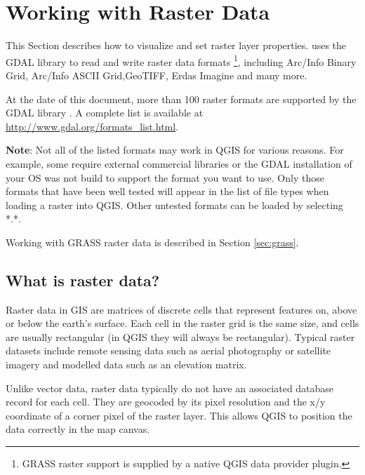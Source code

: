 
\chapter{Working with Raster Data}\label{label_raster}


This Section describes how to visualize and set raster layer properties.
\qg uses the GDAL library to read and write raster data formats
\footnote{GRASS raster support is supplied by a native QGIS data provider 
plugin.}, including Arc/Info Binary Grid, 
Arc/Info ASCII Grid,GeoTIFF,
Erdas Imagine and many more. 

At the date of this document, more than 100 raster formats are supported 
by the GDAL library \cite{GDALweb}. A complete list is available at 
\url{http://www.gdal.org/formats_list.html}.

\textbf{Note}: Not all of the listed formats may work in QGIS for various 
reasons. For example, some require external commercial libraries or 
the GDAL installation of your OS was not build to support the format you want
to use. Only those formats that have been well tested will appear in the list
of file types when loading a raster into QGIS. Other untested formats can 
be loaded by selecting *.*.

Working with GRASS raster data is described in Section \ref{sec:grass}.

\section{What is raster data?}\label{label_whatsraster}

Raster data in GIS are matrices of discrete cells that represent features on,
above or below the earth's surface. Each cell in the raster grid is the same
size, and cells are usually rectangular (in QGIS they will always be
rectangular). Typical raster datasets include remote sensing data such as
aerial photography or satellite imagery and modelled data such as an elevation
matrix.

Unlike vector data, raster data typically do not have an associated database
record for each cell. They are geocoded by its pixel resolution and the x/y
coordinate of a corner pixel of the raster layer. This allows QGIS to position
the data correctly in the map canvas.

